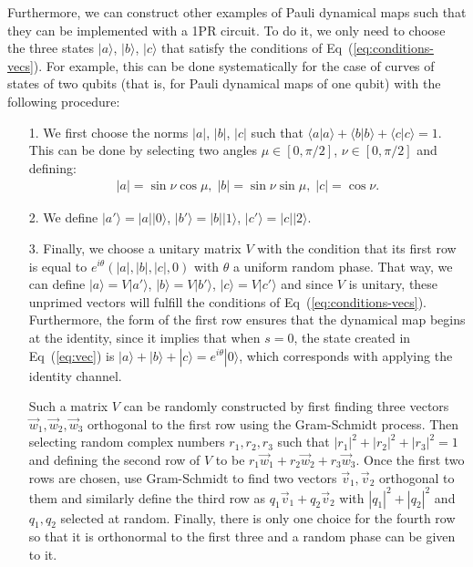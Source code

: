 \documentclass[10pt,letterpaper]{article} %
\newcommand{\eref}[1]{Eq~(\ref{#1})}
\begin{document}
Furthermore, we can construct other examples of 
Pauli dynamical maps such that they
can be implemented with a 1PR circuit.
To do it, we only need to choose the three states $|a\rangle$, $|b\rangle$, $|c\rangle$
that satisfy the conditions of  \eref{eq:conditions-vecs}.
For example, this can be done systematically for the case of curves of states of two qubits
(that is, for Pauli dynamical maps of one qubit)
with the following procedure:
\begin{itemize}
\item[1.] We first choose the norms $|a|$, $|b|$, $|c|$
such that $\langle a| a\rangle + \langle b| b\rangle + \langle c| c\rangle = 1$. 
This can be done by selecting two angles
$\mu \in [0, \pi/2]$, $\nu \in [0,\pi/2]$ and defining:
\begin{align*}
|a| = \sin \nu \cos \mu, \; |b| = \sin \nu \sin \mu , \; |c| = \cos \nu.
\end{align*}
\item[2.] We define $|a'\rangle = |a| |0\rangle$, $|b'\rangle = |b| |1\rangle$, $|c'\rangle = |c| |2\rangle$.
\item[3.] 
Finally, we choose a unitary matrix $V$ with the condition that its first
row is equal to $e^{i\theta} (|a|,|b|,|c|,0)$
with $\theta$ a uniform random phase.
That way, we can define $|a\rangle = V |a'\rangle$, $|b\rangle = V |b'\rangle$, $|c\rangle = V |c'\rangle$
and since $V$ is unitary, these unprimed vectors will fulfill the conditions of
\eref{eq:conditions-vecs}.
Furthermore, the form of the first row ensures that the dynamical map begins at the identity,
since it implies that when $s=0$, the 
state created in \eref{eq:vec}
is
$|a\rangle + |b\rangle + |c\rangle = e^{i \theta} |0\rangle$,
which  corresponds with applying the identity channel.

Such a matrix $V$ can be randomly constructed by first finding three vectors 
$\vec{w}_1 , \vec{w}_2, \vec{w}_3$ orthogonal to
the first row using the Gram-Schmidt process.  Then selecting random complex
numbers $r_1, r_2, r_3$ such that $|r_1|^2 + |r_2|^2 + |r_3|^2 = 1$ and defining
the second row of $V$ to be $r_1 \vec{w}_1 + r_2 \vec{w}_2 + r_3 \vec{w}_3$.
Once the first two rows are chosen, use Gram-Schmidt to find two vectors
$\vec{v}_1, \vec{v}_2$ orthogonal to 
them and similarly define the third row as $q_1 \vec{v}_1+ q_2 \vec{v}_2$
with $|q_1|^2 + |q_2|^2$ and $q_1,q_2$
selected at random. 
Finally, there is only one choice for the fourth row so that it is 
orthonormal to the first three
and a random phase can be given to it.
\end{itemize}
\end{document}
